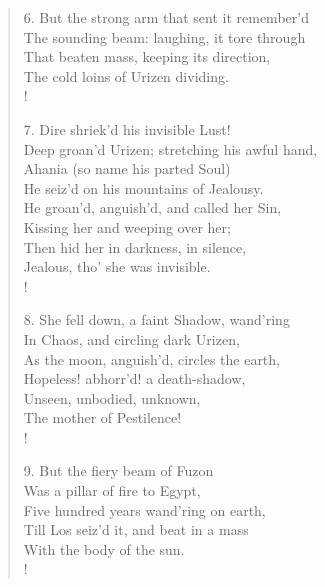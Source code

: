 \documentclass[9pt]{extarticle}
\begin{document}
\begin{verse}
\begin{altverse}
		6. But the strong arm that sent it remember'd\\
		The sounding beam: laughing, it tore through\\
		That beaten mass, keeping its direction,\\
		The cold loins of Urizen dividing.\\!
		
		7. Dire shriek'd his invisible Lust!\\
		Deep groan'd Urizen; stretching his awful hand,\\
		Ahania (so name his parted Soul)\\
		He seiz'd on his mountains of Jealousy.\\
		He groan'd, anguish'd, and called her Sin,\\
		Kissing her and weeping over her;\\
		Then hid her in darkness, in silence,\\
		Jealous, tho' she was invisible.\\!
		
		8. She fell down, a faint Shadow, wand'ring\\
		In Chaos, and circling dark Urizen,\\
		As the moon, anguish'd, circles the earth,\\
		Hopeless! abhorr'd! a death-shadow,\\
		Unseen, unbodied, unknown,\\
		The mother of Pestilence!\\!
		
		9. But the fiery beam of Fuzon\\
		Was a pillar of fire to Egypt,\\
		Five hundred years wand'ring on earth,\\
		Till Los seiz'd it, and beat in a mass\\
		With the body of the sun.\\!
		
\end{altverse}
\end{verse}	
\end{document}
